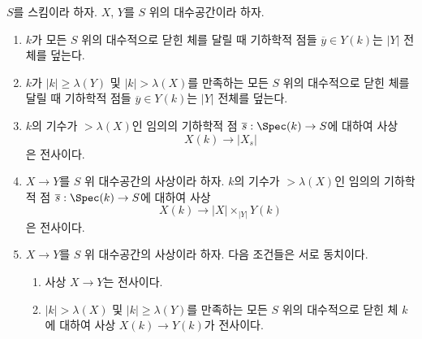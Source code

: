 \begin{lemma}
\label{lemma-large-enough}
$S$를 스킴이라 하자. $X$, $Y$를 $S$ 위의 대수공간이라 하자.
\begin{enumerate}
\item $k$가 모든 $S$ 위의 대수적으로 닫힌 체를 달릴 때
기하학적 점들 $\overline{y} \in Y(k)$는 $|Y|$ 전체를 덮는다.
\item $k$가 $|k| \geq \lambda(Y)$ 및 $|k| > \lambda(X)$를
만족하는 모든 $S$ 위의 대수적으로 닫힌 체를 달릴 때
기하학적 점들 $\overline{y} \in Y(k)$는 $|Y|$ 전체를 덮는다.
\item $k$의 기수가 $> \lambda(X)$인 임의의 기하학적 점
$\overline{s} : \Spec(k) \to S$에 대하여 사상
$$
X(k) \longrightarrow |X_s|
$$
은 전사이다.
\item $X \to Y$를 $S$ 위 대수공간의 사상이라 하자.
$k$의 기수가 $> \lambda(X)$인 임의의 기하학적 점
$\overline{s} : \Spec(k) \to S$에 대하여 사상
$$
X(k) \longrightarrow |X| \times_{|Y|} Y(k)
$$
은 전사이다.
\item $X \to Y$를 $S$ 위 대수공간의 사상이라 하자.
다음 조건들은 서로 동치이다.
\begin{enumerate}
\item 사상 $X \to Y$는 전사이다.
\item $|k| > \lambda(X)$ 및 $|k| \geq \lambda(Y)$를 만족하는
모든 $S$ 위의 대수적으로 닫힌 체 $k$에 대하여
사상 $X(k) \to Y(k)$가 전사이다.
\end{enumerate}
\end{enumerate}
\end{lemma}

